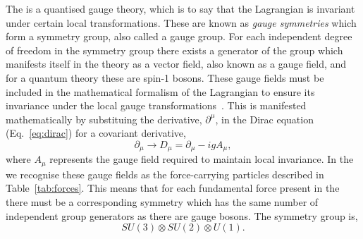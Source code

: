 The \SM is a quantised gauge theory, which is to say that the \SM Lagrangian is invariant under certain local transformations. These are known as \textit{gauge symmetries} which form a symmetry group, also called a gauge group. For each independent degree of freedom in the symmetry group there exists a generator of the group which manifests itself in the theory as a vector field, also known as a gauge field, and for a quantum theory these are spin-1 bosons. These gauge fields must be included in the mathematical formalism of the Lagrangian to ensure its invariance under the local gauge transformations~\cite{Guidry}. This is manifested mathematically by substituing the derivative, $\partial^{\mu}$, in the Dirac equation (Eq.~\ref{eq:dirac}) for a covariant derivative,
\begin{equation}
  \partial_{\mu} \rightarrow D_{\mu} = \partial_{\mu}-igA_{\mu},
\end{equation}
where $A_{\mu}$ represents the gauge field required to maintain local invariance. In the \SM we recognise these gauge fields as the force-carrying particles described in Table~\ref{tab:forces}. This means that for each fundamental force present in the \SM there must be a corresponding symmetry which has the same number of independent group generators as there are gauge bosons. The \SM symmetry group is,
\begin{equation}
  SU(3) \otimes SU(2) \otimes U(1).
\end{equation}

